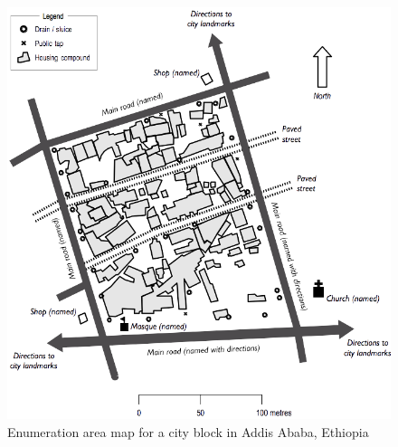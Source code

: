 \documentclass[12pt,a4paper]{book}
\theoremstyle{definition}
\theoremstyle{definition}
\theoremstyle{definition}
\theoremstyle{remark}
\begin{document}
\begin{figure}[H]

{\centering \includegraphics[width=9.76in]{figures/stage2sample12} 

}

\caption{Enumeration area map for a city block in Addis Ababa, Ethiopia}\label{fig:sample26}
\end{figure}
\end{document}
